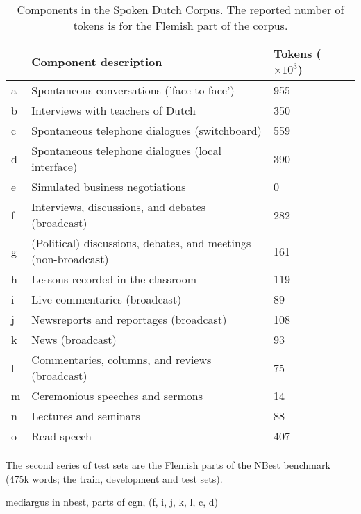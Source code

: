     \begin{table}
    	\begin{tabular}{llll}
              & Component description & \thead{Tokens \\ ($\times 10^3$)} \\ \hline
        	a & Spontaneous conversations ('face-to-face') & 955 & \\
            b & Interviews with teachers of Dutch & 350 & \\
            c & Spontaneous telephone dialogues (switchboard) & 559 & \\ %
            d & Spontaneous telephone dialogues (local interface) & 390 & \\ %
            e & Simulated business negotiations & 0 & \\
            f & Interviews, discussions, and debates (broadcast) & 282 & \\
            g & (Political) discussions, debates, and meetings (non-broadcast) & 161 & \\
            h & Lessons recorded in the classroom & 119 & \\
            i & Live commentaries (broadcast) & 89 & \\
            j & Newsreports and reportages (broadcast) & 108 & \\
            k & News (broadcast) & 93 & \\
            l & Commentaries, columns, and reviews (broadcast) & 75 & \\
            m & Ceremonious speeches and sermons & 14 & \\ 
            n & Lectures and seminars & 88 & \\
            o & Read speech & 407 & 
        \end{tabular}
        \caption{Components in the Spoken Dutch Corpus. The reported number of tokens is for the Flemish part of the corpus. }
        \label{tab:cgn}
    \end{table}
    
    The second series of test sets are the Flemish parts of the NBest benchmark \cite{kessens2007n} (475k words; the train, development and test sets). 
    
    mediargus in nbest, parts of cgn, (f, i, j, k, l, c, d)
    

